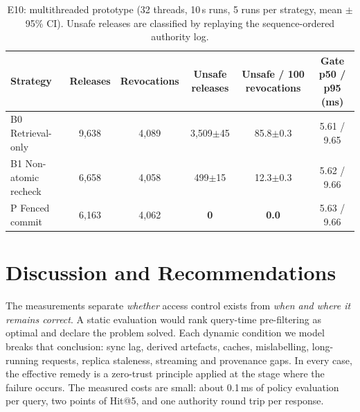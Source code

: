 \documentclass[10pt]{article}
\newcommand{\pmci}[1]{{\scriptsize$\pm$#1}}
\begin{document}
\begin{table}[t]
\centering
\caption{E10: multithreaded prototype (32 threads, 10\,s runs, 5 runs per strategy, mean \pmci{95\% CI}). Unsafe releases are classified by replaying the sequence-ordered authority log.}
\label{tab:proto}
\small
\begin{tabular}{lccccc}
\toprule
Strategy & Releases & Revocations & Unsafe releases & Unsafe / 100 revocations & Gate p50 / p95 (ms)\\
\midrule
B0 Retrieval-only & 9{,}638 & 4{,}089 & 3{,}509\pmci{45} & 85.8\pmci{0.3} & 5.61 / 9.65\\
B1 Non-atomic recheck & 6{,}658 & 4{,}058 & 499\pmci{15} & 12.3\pmci{0.3} & 5.62 / 9.66\\
P Fenced commit & 6{,}163 & 4{,}062 & \textbf{0} & \textbf{0.0} & 5.63 / 9.66\\
\bottomrule
\end{tabular}
\end{table}

\section{Discussion and Recommendations}
\label{sec:discussion}
The measurements separate \emph{whether} access control exists from \emph{when and where it remains correct}. A static evaluation would rank query-time pre-filtering as optimal and declare the problem solved. Each dynamic condition we model breaks that conclusion: sync lag, derived artefacts, caches, mislabelling, long-running requests, replica staleness, streaming and provenance gaps. In every case, the effective remedy is a zero-trust principle applied at the stage where the failure occurs. The measured costs are small: about 0.1\,ms of policy evaluation per query, two points of Hit@5, and one authority round trip per response.
\end{document}
